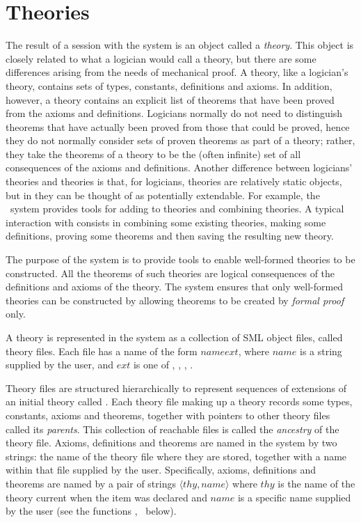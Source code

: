 \section{Theories}
\label{theories}

The result of a session with the \HOL{} system is an object called a
{\it theory\/}.  This object is closely related to what a logician
would call a theory, but there are some differences arising from the
needs of mechanical proof.  A \HOL{} theory, like a logician's theory,
contains sets of types, constants, definitions and axioms.  In
addition, however, a \HOL{} theory contains an explicit list of
theorems that have been proved from the axioms and definitions.
Logicians normally do not need to distinguish theorems that have
actually been proved from those that could be proved, hence they do
not normally consider sets of proven theorems as part of a theory;
rather, they take the theorems of a theory to be the (often infinite)
set of all consequences of the axioms and definitions.  Another
difference between logicians' theories and \HOL{} theories is that, for
logicians, theories are relatively static objects, but in \HOL{} they
can be thought of as potentially extendable. For example, the \HOL\
system provides tools for adding to theories and combining theories.
A typical interaction with \HOL{} consists in combining some existing
theories, making some definitions, proving some theorems and then
saving the resulting new theory.

The purpose of the \HOL{} system is to provide tools to enable
well-formed theories to be constructed.  All the theorems of such
theories are logical consequences of the definitions and axioms of the
theory.  The \HOL{} system ensures that only well-formed theories can
be constructed by allowing theorems to be created by {\it formal
  proof\/} only.

A theory is represented in the \HOL{} system as a collection of SML
object files, called theory files.  Each file has a name of the form
$name$\ml{Theory.}$ext$, where $name$ is a string supplied by the
user, and $ext$ is one of \ml{sig}, \ml{sml}, \ml{ui}, \ml{uo}.

Theory files are structured hierarchically to represent sequences of
extensions of an initial theory called \ml{scratch}.  Each theory file
making up a theory records some types, constants, axioms and theorems,
together with pointers to other theory files called its {\it
  parents\/}.  This collection of reachable files is called the {\it
  ancestry\/} of the theory file. Axioms, definitions and theorems are
named in the \HOL{} system by two strings: the name of the theory file
where they are stored, together with a name within that file supplied
by the user.  Specifically, axioms, definitions and theorems are named
by a pair of strings $\langle thy,name\rangle$ where $thy$ is the name
of the theory current when the item was declared and $name$ is a
specific name supplied by the user (see the functions ,
\ml{new\_definition} \etc\ below).

